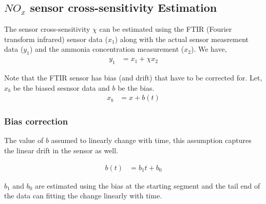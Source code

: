 \subsection{$NO_x$ sensor cross-sensitivity Estimation \label{sec::cross}}

The sensor cross-sensitivity $\chi$ can be estimated using the FTIR (Fourier
transform infrared) sensor data ($x_1$) along with the actual sensor measrement
data ($y_1$) and the ammonia concentration measurement ($x_2$). We have,
\begin{align*}
    y_1 &= x_1 + \chi x_2
\end{align*}

Note that the FTIR sensor has bias (and drift) that have to be corrected for.
Let, $x_b$ be the biased sesnsor data and $b$ be the bias.
\begin{align*}
    x_b &= x + b(t)
\end{align*}

\subsubsection{Bias correction}
The value of $b$ assumed to linearly change with time, this assumption captures
the linear drift in the sensor as well.

\begin{align*}
    b(t) &= b_1 t + b_0
\end{align*}

$b_1$ and $b_0$ are estimated using the bias at the starting segment and the
tail end of the data can fitting the change linearly with time.

